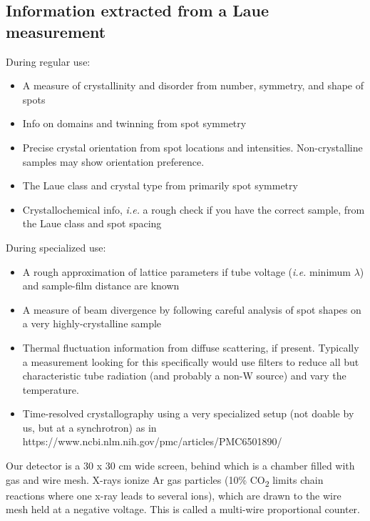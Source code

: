 \subsection{Information extracted from a Laue measurement}
\begin{singlespace}
During regular use:
\begin{itemize}
    \item A measure of crystallinity and disorder from number, symmetry, and shape of spots
    \item Info on domains and twinning from spot symmetry
    \item Precise crystal orientation from spot locations and intensities. Non-crystalline samples may show orientation preference.
    \item The Laue class and crystal type from primarily spot symmetry 
    \item Crystallochemical info, \textit{i.e.} a rough check if you have the correct sample, from the Laue class and spot spacing
\end{itemize}
\end{singlespace}
During specialized use:
\begin{itemize}
    \item A rough approximation of lattice parameters if tube voltage (\textit{i.e.} minimum $\lambda$) and sample-film distance are known
    \item A measure of beam divergence by following careful analysis of spot shapes on a very highly-crystalline sample 
    \item Thermal fluctuation information from diffuse scattering, if present. Typically a measurement looking for this specifically would use filters to reduce all but characteristic tube radiation (and probably a non-W source) and vary the temperature.
    \item Time-resolved crystallography using a very specialized setup (not doable by us, but at a synchrotron) as in https://www.ncbi.nlm.nih.gov/pmc/articles/PMC6501890/ 
\end{itemize}
Our detector is a 30 x 30 cm wide screen, behind which is a chamber filled with gas and wire mesh. X-rays ionize Ar gas particles (10\% CO\textsubscript{2} limits chain reactions where one x-ray leads to several ions), which are drawn to the wire mesh held at a negative voltage. This is called a multi-wire proportional counter.

